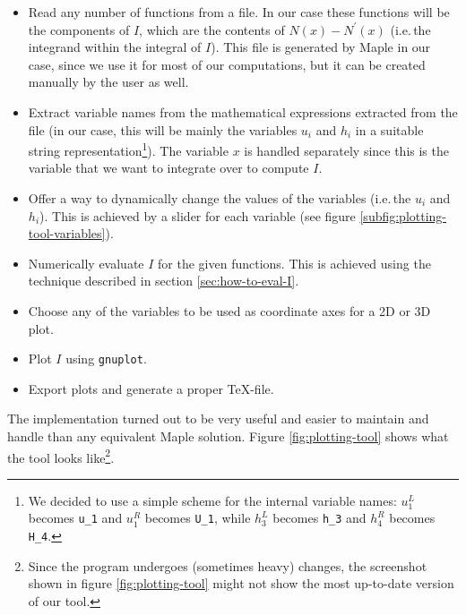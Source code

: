 \documentclass{article}
\begin{document}
\begin{itemize}
\item Read any number of functions from a file. In our case these functions will be the components of $I$, which are the contents of $N\left(x\right)-N^\prime\left(x\right)$ (i.e.\,the integrand within the integral of $I$). This file is generated by Maple in our case, since we use it for most of our computations, but it can be created manually by the user as well.
\item Extract variable names from the mathematical expressions extracted from the file (in our case, this will be mainly the variables $u_i$ and $h_i$ in a suitable string representation\footnote{We decided to use a simple scheme for the internal variable names: $u_1^L$ becomes \texttt{u\_1} and $u_1^R$ becomes \texttt{U\_1}, while $h_3^L$ becomes \texttt{h\_3} and $h_4^R$ becomes \texttt{H\_4}.}). The variable $x$ is handled separately since this is the variable that we want to integrate over to compute $I$.
\item Offer a way to dynamically change the values of the variables (i.e.\,the $u_i$ and $h_i$). This is achieved by a slider for each variable (see figure \ref{subfig:plotting-tool-variables}).
\item Numerically evaluate $I$ for the given functions. This is achieved using the technique described in section \ref{sec:how-to-eval-I}.
\item Choose any of the variables to be used as coordinate axes for a 2D or 3D plot.
\item Plot $I$ using \texttt{gnuplot}.
\item Export plots and generate a proper TeX-file.
\end{itemize}

The implementation turned out to be very useful and easier to maintain and handle than any equivalent Maple solution. Figure \ref{fig:plotting-tool} shows what the tool looks like\footnote{Since the program undergoes (sometimes heavy) changes, the screenshot shown in figure \ref{fig:plotting-tool} might not show the most up-to-date version of our tool.}.
\end{document}
